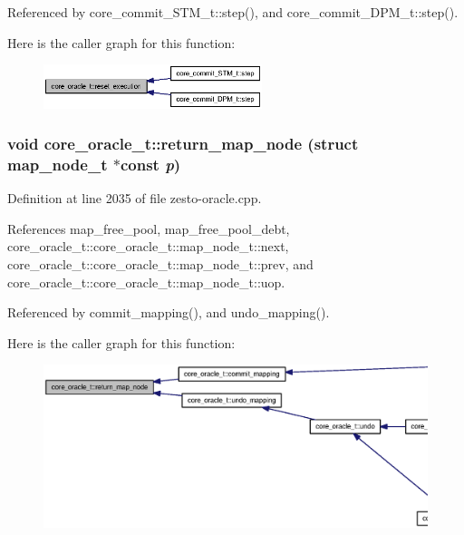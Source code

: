 Referenced by core\_\-commit\_\-STM\_\-t::step(), and core\_\-commit\_\-DPM\_\-t::step().

Here is the caller graph for this function:\nopagebreak
\begin{figure}[H]
\begin{center}
\leavevmode
\includegraphics[width=181pt]{classcore__oracle__t_cd307b32aa377a56b3f4dc79b2122038_icgraph}
\end{center}
\end{figure}
\subsubsection[{return\_\-map\_\-node}]{\setlength{\rightskip}{0pt plus 5cm}void core\_\-oracle\_\-t::return\_\-map\_\-node (struct {\bf map\_\-node\_\-t} $\ast$const  {\em p})\hspace{0.3cm}{\tt  [protected]}}\label{classcore__oracle__t_6ed0bc2ff222597a87894e8fe6d53fc1}




Definition at line 2035 of file zesto-oracle.cpp.

References map\_\-free\_\-pool, map\_\-free\_\-pool\_\-debt, core\_\-oracle\_\-t::core\_\-oracle\_\-t::map\_\-node\_\-t::next, core\_\-oracle\_\-t::core\_\-oracle\_\-t::map\_\-node\_\-t::prev, and core\_\-oracle\_\-t::core\_\-oracle\_\-t::map\_\-node\_\-t::uop.

Referenced by commit\_\-mapping(), and undo\_\-mapping().

Here is the caller graph for this function:\nopagebreak
\begin{figure}[H]
\begin{center}
\leavevmode
\includegraphics[width=420pt]{classcore__oracle__t_6ed0bc2ff222597a87894e8fe6d53fc1_icgraph}
\end{center}
\end{figure}

